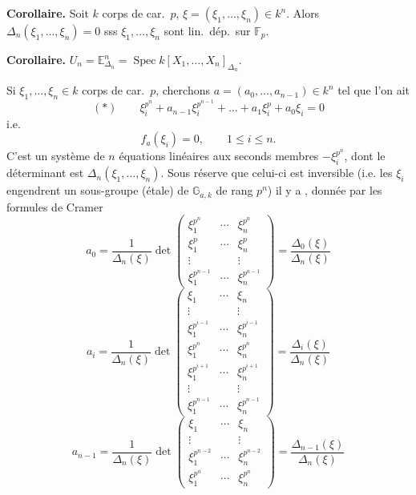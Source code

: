 \documentclass[11pt,a4paper]{article}
\begin{document}
\textbf{Corollaire.} Soit $k$ corps de car.\ $p$,
$\xi = (\xi_1, \dots, \xi_n) \in k^n$. Alors
$\Delta_n(\xi_1, \dots, \xi_n) = 0$ sss $\xi_1, \dots, \xi_n$ sont lin.\ dép.\ sur
$\mathbb{F}_p$.

\textbf{Corollaire.} $U_n = \mathbb{E}^n_{\Delta_n} = \operatorname{Spec}
k[X_1, \dots, X_n]_{\Delta_n}$.

Si $\xi_1, \dots, \xi_n \in k$ corps de car.\ $p$, cherchons
$a = (a_0, \dots, a_{n-1}) \in k^n$ tel que l'on ait
\[
  (*) \qquad \xi_i^{p^n} + a_{n-1}\xi_i^{p^{n-1}} + \dots + a_1 \xi_i^{p} + a_0 \xi_i = 0
\]
i.e.
\[
  f_a(\xi_i) = 0, \qquad 1 \leqslant i \leqslant n .
\]
C'est un système de $n$ équations linéaires \struck{\ill{}}  aux
seconds membres $-\xi_i^{p^n}$, dont le déterminant est
$\Delta_n(\xi_1, \dots, \xi_n)$. Sous réserve que celui-ci est inversible
(i.e. les $\xi_i$ engendrent un sous-groupe  (étale) de $\mathbb{G}_{a,k}$
de rang $p^n$) il y a , donnée par les formules
de Cramer
\[
  a_0 = \frac{1}{\Delta_n(\xi)}\det\begin{pmatrix}
    \xi_1^{p^n} & \cdots & \xi_n^{p^n} \\
    \xi_1^{p} & \cdots & \xi_n^{p} \\
    \vdots & & \vdots \\
    \xi_1^{p^{n-1}} & \cdots & \xi_n^{p^{n-1}}
  \end{pmatrix}
  = \frac{\Delta_0(\xi)}{\Delta_n(\xi)}
\]
\[
  a_i = \frac{1}{\Delta_n(\xi)}\det\begin{pmatrix}
    \xi_1 & \cdots & \xi_n \\
    \vdots & & \vdots \\
    \xi_1^{p^{i-1}} & \cdots & \xi_n^{p^{i-1}} \\
    \xi_1^{p^{n}} & \cdots & \xi_n^{p^{n}} \\
    \xi_1^{p^{i+1}} & \cdots & \xi_n^{p^{i+1}} \\
    \vdots & & \vdots \\
    \xi_1^{p^{n-1}} & \cdots & \xi_n^{p^{n-1}}
  \end{pmatrix}
  = \frac{\Delta_i(\xi)}{\Delta_n(\xi)}
\]
\[
  a_{n-1} = \frac{1}{\Delta_n(\xi)}\det\begin{pmatrix}
    \xi_1 & \cdots & \xi_n \\
    \vdots & & \vdots \\
    \xi_1^{p^{n-2}} & \cdots & \xi_n^{p^{n-2}} \\
    \xi_1^{p^{n}} & \cdots & \xi_n^{p^{n}}
  \end{pmatrix}
  = \frac{\Delta_{n-1}(\xi)}{\Delta_n(\xi)}
\]
\end{document}
